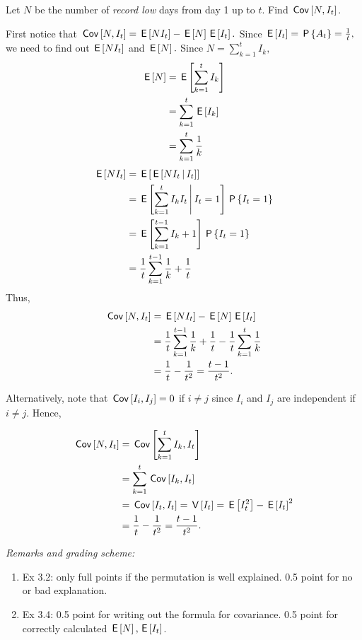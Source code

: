 \begin{exercise}[2]
Let $N$ be the number of \textit{record low} days from day 1 up to $t$. Find $\,\mathsf{Cov}\left[N, I_t\right]$.
\begin{solution}
  First notice that $\,\mathsf{Cov}\left[N, I_t\right]=\,\mathsf{E}\left[NI_t\right]-\,\mathsf{E}\left[N\right]\,\mathsf{E}\left[I_t\right].$ Since $\,\mathsf{E}\left[I_t\right]=\,\mathsf{P}\left\{A_t\right\}=\frac{1}{t},$ we need to find out $\,\mathsf{E}\left[NI_t\right]$ and $\,\mathsf{E}\left[N\right].$
    Since $N=\sum_{k=1}^t I_k,$
    \begin{align*}
        \,\mathsf{E}\left[N\right] &= \,\mathsf{E}\left[\sum_{k=1}^t I_k\right]\\
        &=\sum_{k=1}^t \,\mathsf{E}\left[I_k\right]\\
        &= \sum_{k=1}^t \frac{1}{k}
    \end{align*}
    \begin{align*}
        \,\mathsf{E}\left[NI_t\right]&=\,\mathsf{E}\left[\,\mathsf{E}\left[NI_t \,\middle|\, I_t\right]\right]\\
        &=\,\mathsf{E}\left[\sum_{k=1}^t I_k I_t \,\middle|\, I_t=1\right]\,\mathsf{P}\left\{I_t=1\right\} \\
        &=\,\mathsf{E}\left[\sum_{k=1}^{t-1} I_k+1\right] \,\mathsf{P}\left\{I_t=1\right\}\\
        &=\frac1t \sum_{k=1}^{t-1} \frac{1}{k}+\frac1t
    \end{align*}
    Thus,
    \begin{align*}
        \,\mathsf{Cov}\left[N, I_t\right]&=\,\mathsf{E}\left[NI_t\right]-\,\mathsf{E}\left[N\right]\,\mathsf{E}\left[I_t\right]\\
        &=\frac1t\sum_{k=1}^{t-1} \frac{1}{k}+\frac1t- \frac{1}{t}\sum_{k=1}^t \frac{1}{k}\\
        &=\frac1t - \frac1{t^2} = \frac{t-1}{t^2}.
    \end{align*}
    
    Alternatively, note that $\,\mathsf{Cov}\left[I_i, I_j\right] = 0$ if $i \neq j$ since $I_i$ and $I_j$ are independent if  $i \neq j$. Hence, 
    
    \begin{align*}
        \,\mathsf{Cov}\left[N, I_t\right] &= \,\mathsf{Cov}\left[\sum_{k=1}^t I_k, I_t\right] \\
        &=\sum_{k=1}^t  \,\mathsf{Cov}\left[ I_k, I_t\right] \\
        &= \,\mathsf{Cov}\left[I_t, I_t\right] = \,\mathsf{V}\left[I_t\right] = \,\mathsf{E}\left[I_t^2\right] - \,\mathsf{E}\left[I_t\right]^2 \\
        &= \frac1t - \frac1{t^2} = \frac{t-1}{t^2}.
    \end{align*}
\end{solution}
\end{exercise}

\noindent \textit{Remarks and grading scheme:}
\begin{enumerate}
    \item Ex 3.2: only full points if the permutation is well explained. 0.5 point for no or bad explanation.
    \item Ex 3.4: 0.5 point for writing out the formula for covariance. 0.5 point for correctly calculated $\,\mathsf{E}\left[N\right], \,\mathsf{E}\left[I_t\right]$.
\end{enumerate}

